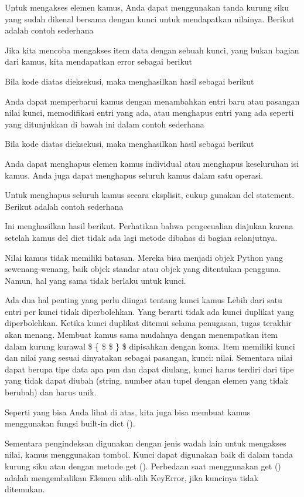 Untuk mengakses elemen kamus, Anda dapat menggunakan tanda kurung siku yang sudah dikenal bersama dengan kunci untuk mendapatkan nilainya. Berikut adalah contoh sederhana 

Jika kita mencoba mengakses item data dengan sebuah kunci, yang bukan bagian dari kamus, kita mendapatkan error sebagai berikut 

Bila kode diatas dieksekusi, maka menghasilkan hasil sebagai berikut 

Anda dapat memperbarui kamus dengan menambahkan entri baru atau pasangan nilai kunci, memodifikasi entri yang ada, atau menghapus entri yang ada seperti yang ditunjukkan di bawah ini dalam contoh sederhana 

Bila kode diatas dieksekusi, maka menghasilkan hasil sebagai berikut

Anda dapat menghapus elemen kamus individual atau menghapus keseluruhan isi kamus. Anda juga dapat menghapus seluruh kamus dalam satu operasi.

Untuk menghapus seluruh kamus secara eksplisit, cukup gunakan del statement. Berikut adalah contoh sederhana

Ini menghasilkan hasil berikut. Perhatikan bahwa pengecualian diajukan karena setelah kamus del dict tidak ada lagi metode dibahas di bagian selanjutnya. \par

Nilai kamus tidak memiliki batasan. Mereka bisa menjadi objek Python yang sewenang-wenang, baik objek standar atau objek yang ditentukan pengguna. Namun, hal yang sama tidak berlaku untuk kunci. 
 
Ada dua hal penting yang perlu diingat tentang kunci kamus 
Lebih dari satu entri per kunci tidak diperbolehkan. Yang berarti tidak ada kunci duplikat yang diperbolehkan. Ketika kunci duplikat ditemui selama penugasan, tugas terakhir akan menang. 
Membuat kamus sama mudahnya dengan menempatkan item dalam kurung kurawal  \$  \{  \$ \$  \}  \$ dipisahkan dengan koma. Item memiliki kunci dan nilai yang sesuai dinyatakan sebagai pasangan, kunci: nilai. Sementara nilai dapat berupa tipe data apa pun dan dapat diulang, kunci harus terdiri dari tipe yang tidak dapat diubah (string, number atau tupel dengan elemen yang tidak berubah) dan harus unik.

Seperti yang bisa Anda lihat di atas, kita juga bisa membuat kamus menggunakan fungsi built-in dict (). 

Sementara pengindeksan digunakan dengan jenis wadah lain untuk mengakses nilai, kamus menggunakan tombol. Kunci dapat digunakan baik di dalam tanda kurung siku atau dengan metode get (). Perbedaan saat menggunakan get () adalah mengembalikan Elemen alih-alih KeyError, jika kuncinya tidak ditemukan. \par

